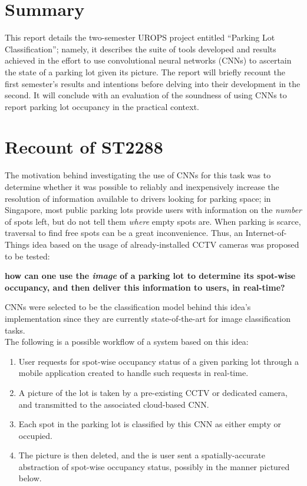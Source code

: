 \documentclass[a4paper, 11pt]{article} %
\begin{document}
\tableofcontents

\newpage

\section{Summary}
    This report details the two-semester UROPS project entitled ``Parking Lot
    Classification''; namely, it describes the suite of tools developed and 
    results achieved in the effort to use
    convolutional neural networks (CNNs) to ascertain the state of a parking lot given its picture. The 
    report will briefly recount the first semester's results and intentions 
    before delving into their development in the second. It will conclude with 
    an evaluation of the soundness of using CNNs to report parking lot 
    occupancy in the practical context.
\section{Recount of ST2288}
	The motivation behind investigating the use of CNNs for this task was to 
	determine whether it was 
	possible to reliably and inexpensively increase the resolution of information available to drivers 
	looking for parking space; in Singapore, most public parking lots provide 
	users with information on the \textit{number} of 
	spots left, but do not tell them \textit{where} empty spots are. When 
	parking is scarce, traversal to find free spots 
	can be a great inconvenience. Thus, an Internet-of-Things idea based on the usage of 
	already-installed CCTV cameras was proposed to be tested:
	\begin{center}
		\textbf{
			how can one use the \textit{image} of a parking lot to determine its spot-wise occupancy, and 
			then deliver this information to users, in real-time?}
	\end{center}
	CNNs were selected to be the classification model behind this idea's implementation since they are 
	currently state-of-the-art for image classification tasks.\\
	The following is a possible workflow of a system based on this idea: 
	\begin{enumerate}
		\item User requests for spot-wise occupancy status of a given parking lot through a mobile 
		application created to handle such requests in real-time.
		\item A picture of the lot is taken by a pre-existing CCTV or dedicated camera, and transmitted to 
		the associated cloud-based CNN.
		\item Each spot in the parking lot is classified by this CNN as either empty or occupied.
		\item The picture is then deleted, and the is user sent a spatially-accurate abstraction of 
		spot-wise occupancy status, possibly in the manner pictured below.
	\end{enumerate}
\end{document}
